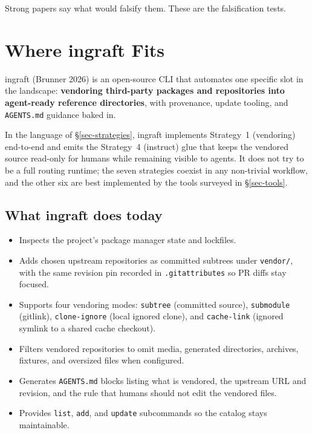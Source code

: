 \documentclass[
  11pt,
  letterpaper,
  numbers=noendperiod,
  parskip=half]{scrartcl}
\providecommand{\tightlist}{%
  \setlength{\itemsep}{0pt}\setlength{\parskip}{0pt}}
\begin{document}
Strong papers say what would falsify them. These are the falsification
tests.

\fi

\section{Where ingraft Fits}\label{sec-ingraft}

ingraft (Brunner 2026) is an open-source CLI that automates one specific
slot in the landscape: \textbf{vendoring third-party packages and
repositories into agent-ready reference directories}, with provenance,
update tooling, and \texttt{AGENTS.md} guidance baked in.

In the language of \S\ref{sec-strategies}, ingraft implements
Strategy~1 (vendoring) end-to-end and emits the Strategy~4 (instruct)
glue that keeps the vendored source read-only for humans while
remaining visible to agents. It does not try to be a full routing
runtime; the seven strategies coexist in any non-trivial workflow, and
the other six are best implemented by the tools surveyed in
\S\ref{sec-tools}.

\subsection*{What ingraft does today}

\begin{itemize}
\tightlist
\item
  Inspects the project's package manager state and lockfiles.
\item
  Adds chosen upstream repositories as committed subtrees under
  \texttt{vendor/}, with the same revision pin recorded in
  \texttt{.gitattributes} so PR diffs stay focused.
\item
  Supports four vendoring modes: \texttt{subtree} (committed source),
  \texttt{submodule} (gitlink), \texttt{clone-ignore} (local ignored
  clone), and \texttt{cache-link} (ignored symlink to a shared cache
  checkout).
\item
  Filters vendored repositories to omit media, generated directories,
  archives, fixtures, and oversized files when configured.
\item
  Generates \texttt{AGENTS.md} blocks listing what is vendored, the
  upstream URL and revision, and the rule that humans should not edit
  the vendored files.
\item
  Provides \texttt{list}, \texttt{add}, and \texttt{update}
  subcommands so the catalog stays maintainable.
\end{itemize}
\end{document}
